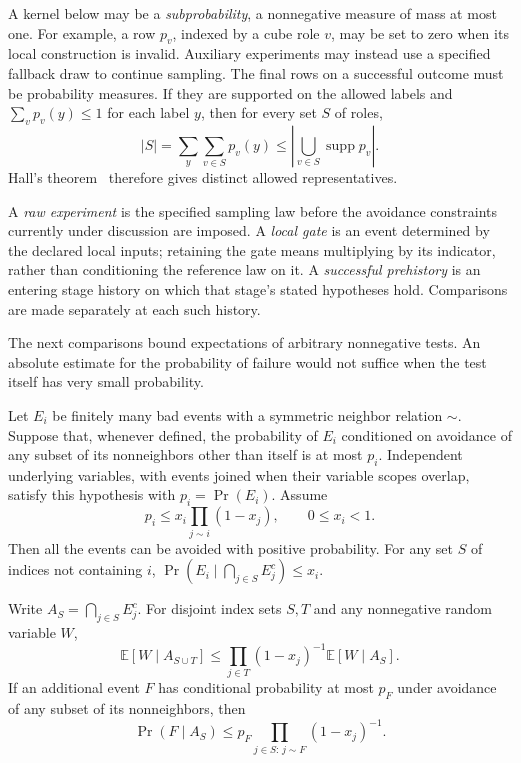A kernel below may be a \emph{subprobability}, a nonnegative measure of
mass at most one. For example, a row \(p_v\), indexed by a cube role
\(v\), may be set to zero when its local construction is invalid.
Auxiliary experiments may instead use a specified fallback draw to
continue sampling. The final rows on a successful outcome must be
probability measures. If they are supported on the allowed labels and
\(\sum_v p_v(y)\le1\) for each label \(y\), then for every set \(S\) of
roles,
\[
 |S|=\sum_y\sum_{v\in S}p_v(y)
 \le\left|\bigcup_{v\in S}\operatorname{supp}p_v\right|.
\]
Hall's theorem~\cite{hall1935} therefore gives distinct allowed
representatives.

\begin{definition}
A \emph{raw experiment} is the specified sampling law before the avoidance
constraints currently under discussion are imposed. A \emph{local gate}
is an event determined by the declared local inputs; retaining the gate
means multiplying by its indicator, rather than conditioning the
reference law on it. A \emph{successful prehistory} is an entering stage
history on which that stage's stated hypotheses hold. Comparisons are
made separately at each such history.
\end{definition}

The next comparisons bound expectations of arbitrary nonnegative tests.
An absolute estimate for the probability of failure would not suffice
when the test itself has very small probability.

\begin{lemma}\label{lem:conditional-avoidance}
Let \(E_i\) be finitely many bad events with a symmetric neighbor relation
\(\sim\). Suppose that, whenever defined, the probability of \(E_i\)
conditioned on avoidance of any subset of its nonneighbors other than
itself is at most \(p_i\). Independent underlying variables, with events
joined when their variable scopes overlap, satisfy this hypothesis with
\(p_i=\Pr(E_i)\). Assume
\[
 p_i\le x_i\prod_{j\sim i}(1-x_j),\qquad 0\le x_i<1.
\]
Then all the events can be avoided with positive probability. For any set
\(S\) of indices not containing \(i\),
\(\Pr(E_i\mid \bigcap_{j\in S}E_j^c)\le x_i\).

Write \(A_S=\bigcap_{j\in S}E_j^c\). For disjoint index sets \(S,T\) and
any nonnegative random variable \(W\),
\[
 \mathbb E[W\mid A_{S\cup T}]
 \le \prod_{j\in T}(1-x_j)^{-1}\mathbb E[W\mid A_S].
\]
If an additional event \(F\) has conditional probability at most \(p_F\)
under avoidance of any subset of its nonneighbors, then
\[
 \Pr(F\mid A_S)\le
 p_F\prod_{j\in S:\,j\sim F}(1-x_j)^{-1}.
\]
\end{lemma}

